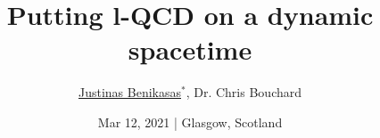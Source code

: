 

\usepackage{amsmath}
\usepackage{booktabs}
\usepackage{rotating}
\usepackage{wasysym}

\graphicspath{{images/}}

\title[l-QCD vs. spacetime]
    {Putting l-QCD on a dynamic spacetime}
\author[Justinas Benikasas]{
    \texorpdfstring{\underline{Justinas Benikasas}$^*$}{Justinas Benikasas},
    \texorpdfstring{Dr. Chris Bouchard}{}}
\date{Mar 12, 2021 | Glasgow, Scotland\vspace{6pt}}

\newcommand{\yes}{\CIRCLE}
\newcommand{\no}{\Circle}
\newcommand{\partially}{\LEFTcircle}



\begin{frame}[plain]
  \titlepage{}
\end{frame}


